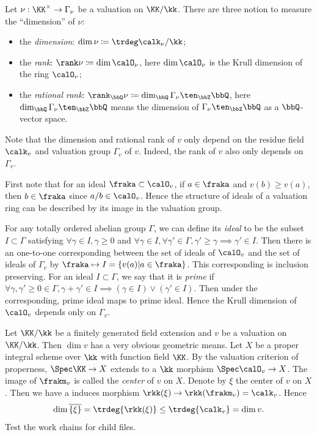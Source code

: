\begin{definition}
	Let $\nu: \KK^\times \to \Gamma_\nu$ be a valuation on $\KK/\kk$.
	There are three notion to measure the ``dimension'' of $\nu$:
	\begin{itemize}
		\item the \emph{dimension}: $\dim \nu \coloneqq \trdeg \calk_\nu/\kk$;
		\item the \emph{rank}: $\rank \nu \coloneqq \dim \calO_\nu$, here $\dim \calO_\nu$ is the Krull dimension of the ring $\calO_\nu$;
		\item the \emph{rational rank}: $\rank_\bbQ \nu \coloneqq \dim_\bbQ \Gamma_\nu \ten_\bbZ \bbQ$, here $\dim_\bbQ \Gamma_\nu \ten_\bbZ \bbQ$ means the dimension of $\Gamma_\nu \ten_\bbZ \bbQ$ as a $\bbQ$-vector space.
	\end{itemize}
\end{definition}

\begin{remark}
	Note that the dimension and rational rank of $v$ only depend on the residue field $\calk_v$ and valuation group $\Gamma_v$ of $v$.
	Indeed, the rank of $v$ also only depends on $\Gamma_v$.

	First note that for an ideal $\fraka \subset \calO_v$, if $a \in \fraka$ and $v(b) \geq v(a)$, then $b \in \fraka$ since $a/b \in \calO_v$.
	Hence the structure of ideals of a valuation ring can be described by its image in the valuation group.

	For any totally ordered abelian group $\Gamma$, we can define its \emph{ideal} to be the subset $I \subset \Gamma$ satisfying $\forall \gamma \in I, \gamma \geq 0$ and $\forall \gamma \in I, \forall \gamma' \in \Gamma, \gamma' \geq \gamma \implies \gamma' \in I$.
	Then there is an one-to-one corresponding between the set of ideals of $\calO_v$ and the set of ideals of $\Gamma_v$ by $\fraka \mapsto I = \{v(a)|a \in \fraka\}$.
	This corresponding is inclusion preserving.
	For an ideal $I \subset \Gamma$, we say that it is \emph{prime} if $\forall \gamma,\gamma' \geq 0 \in \Gamma, \gamma+\gamma' \in I \implies (\gamma \in I) \lor (\gamma' \in I)$.
	Then under the corresponding, prime ideal maps to prime ideal.
	Hence the Krull dimension of $\calO_v$ depends only on $\Gamma_v$.
\end{remark}

\begin{remark}
	Let $\KK/\kk$ be a finitely generated field extension and $v$ be a valuation on $\KK/\kk$.
	Then $\dim v$ has a very obvious geometric means.
	Let $X$ be a proper integral scheme over $\kk$ with function field $\KK$.
	By the valuation criterion of properness, $\Spec \KK \to X$ extends to a $\kk$ morphism $\Spec \calO_v \to X$.
	The image of $\frakm_v$ is called the \emph{center} of $v$ on $X$.
	Denote by $\xi$ the center of $v$ on $X$.
	Then we have a induces morphism $\rkk(\xi) \to \rkk(\frakm_v) = \calk_v$.
	Hence
	\[ \dim \overline{\{\xi\}} = \trdeg{ \rkk(\xi) } \leq \trdeg{ \calk_v } = \dim v. \]
	\Yang{}
	Test the work chains for child files.
\end{remark}


